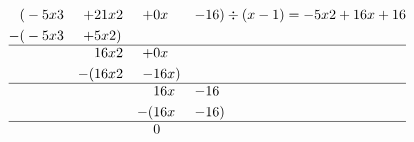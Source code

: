 $$
    \begin{aligned} (&-5x3 &+ &21x2 &+ &0x &- &16) \div (x-1) = -5x2 + 16x + 16 \\
        -(&-5x3 &+ &5x2) \\
        \hline
        & & &16x2 &+ &0x \\ 
        & & -(&16x2 &- &16x) \\ 
        \hline 
        & & & & &16x &- &16 \\
        & & & & -(&16x &- &16) \\
        \hline 
        & & & & &0 \\
     \end{aligned}
$$